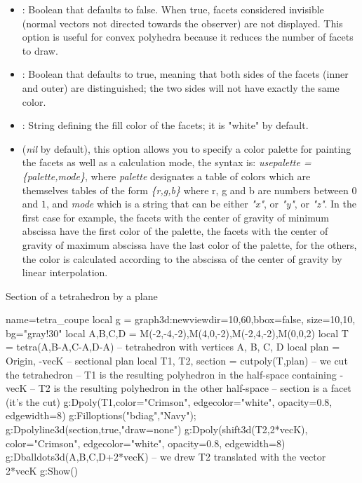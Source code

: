 \begin{itemize}
    \item {}: Boolean that defaults to false. When true, facets considered invisible (normal vectors not directed towards the observer) are not displayed. This option is useful for convex polyhedra because it reduces the number of facets to draw.
    \item {}: Boolean that defaults to true, meaning that both sides of the facets (inner and outer) are distinguished; the two sides will not have exactly the same color.
    \item {}: String defining the fill color of the facets; it is "white" by default.     \item {} (\emph{nil} by default), this option allows you to specify a color palette for painting the facets as well as a calculation mode, the syntax is: \emph{usepalette = \{palette,mode\}}, where \emph{palette} designates a table of colors which are themselves tables of the form \emph{\{r,g,b\}} where r, g and b are numbers between $0$ and $1$, and \emph{mode} which is a string that can be either \emph{"x"}, or \emph{"y"}, or \emph{"z"}. In the first case for example, the facets with the center of gravity of minimum abscissa have the first color of the palette, the facets with the center of gravity of maximum abscissa have the last color of the palette, for the others, the color is calculated according to the abscissa of the center of gravity by linear interpolation. \end{itemize}

\begin{demo}{Section of a tetrahedron by a plane}
\begin{luadraw}{name=tetra_coupe}
local g = graph3d:new{viewdir={10,60},bbox=false, size={10,10}, bg="gray!30"}
local A,B,C,D = M(-2,-4,-2),M(4,0,-2),M(-2,4,-2),M(0,0,2)
local T = tetra(A,B-A,C-A,D-A) -- tetrahedron with vertices A, B, C, D
local plan = {Origin, -vecK}  -- sectional plan
local T1, T2, section = cutpoly(T,plan) -- we cut the tetrahedron
-- T1 is the resulting polyhedron in the half-space containing -vecK
-- T2 is the resulting polyhedron in the other half-space
-- section is a facet (it's the cut)
g:Dpoly(T1,{color="Crimson", edgecolor="white", opacity=0.8, edgewidth=8})
g:Filloptions("bdiag","Navy"); g:Dpolyline3d(section,true,"draw=none")
g:Dpoly(shift3d(T2,2*vecK), {color="Crimson", edgecolor="white", opacity=0.8, edgewidth=8})
g:Dballdots3d({A,B,C,D+2*vecK}) -- we drew T2 translated with the vector 2*vecK
g:Show()
\end{luadraw}
\end{demo}

